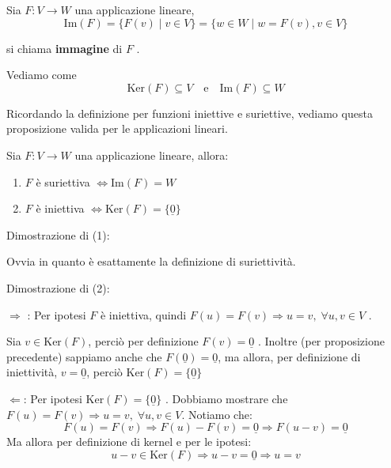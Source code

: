\documentclass[
  a4paper,
]{article}
\providecommand{\tightlist}{%
  \setlength{\itemsep}{0pt}\setlength{\parskip}{0pt}}
\providecommand{\tightlist}{}
\begin{document}
\begin{definitionbox}
Sia \(F: V \to W\) una applicazione lineare, \[
\text{Im}(F) = \{F(v) \mid v \in V\} = \{w \in W \mid w = F(v), v \in V\}
\]

si chiama \textbf{immagine} di \(F\) .
\end{definitionbox}

\begin{observationbox}
Vediamo come \[
\text{Ker}(F) \subseteq V \quad \text{e} \quad \text{Im}(F) \subseteq W
\]
\end{observationbox}

Ricordando la definizione per funzioni iniettive e suriettive, vediamo
questa proposizione valida per le applicazioni lineari.

\begin{propositionbox}
Sia \(F: V \to W\) una applicazione lineare, allora:

\begin{enumerate}
\def\labelenumi{\arabic{enumi}.}
\tightlist
\item
  \(F\) è suriettiva \(\iff \text{Im}(F) = W\)
\item
  \(F\) è iniettiva \(\iff \text{Ker}(F) = \{\underline{0}\}\)
\end{enumerate}
\end{propositionbox}

\begin{proofbox}
Dimostrazione di (1):

Ovvia in quanto è esattamente la definizione di suriettività.

\bigskip

Dimostrazione di (2):

\(\Rightarrow\) : Per ipotesi \(F\) è iniettiva, quindi
\(F(u) = F(v) \Longrightarrow u = v, \; \forall u, v \in V\) .

Sia \(v \in \text{Ker}(F)\), perciò per definizione
\(F(v) = \underline{0}\) . Inoltre (per proposizione precedente)
sappiamo anche che \(F(\underline{0}) = \underline{0}\), ma allora, per
definizione di iniettività, \(v = \underline{0}\), perciò
\(\text{Ker}(F) = \{\underline{0}\}\)

\(\Leftarrow\): Per ipotesi \(\text{Ker}(F) = \{\underline{0}\}\) .
Dobbiamo mostrare che
\(F(u) = F(v) \Longrightarrow u = v, \; \forall u, v \in V\). Notiamo
che: \[
F(u) = F(v) \Longrightarrow F(u) - F(v) = \underline{0}  \Longrightarrow F(u - v) = \underline{0}
\] Ma allora per definizione di kernel e per le ipotesi: \[
u -v \in \text{Ker}(F) \Longrightarrow u - v = \underline{0} \Longrightarrow u = v
\]
\end{proofbox}
\end{document}
